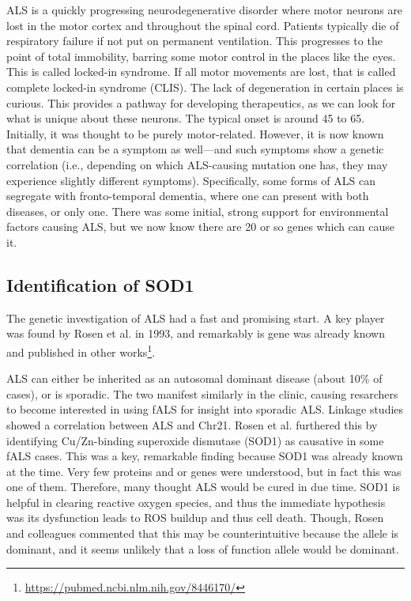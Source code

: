 ALS is a quickly progressing neurodegenerative disorder where motor neurons are lost in the motor cortex and throughout the spinal cord. Patients typically die of respiratory failure if not put on permanent ventilation. This progresses to the point of total immobility, barring some motor control in the places like the eyes. This is called locked-in syndrome. If all motor movements are lost, that is called complete locked-in syndrome (CLIS). The lack of degeneration in certain places is curious. This provides a pathway for developing therapeutics, as we can look for what is unique about these neurons. The typical onset is around 45 to 65. Initially, it was thought to be purely motor-related. However, it is now known that dementia can be a symptom as well---and such symptoms show a genetic correlation (i.e., depending on which ALS-causing mutation one has, they may experience slightly different symptoms). Specifically, some forms of ALS can segregate with fronto-temporal dementia, where one can present with both diseases, or only one. There was some initial, strong support for environmental factors causing ALS, but we now know there are 20 or so genes which can cause it. 

\subsection*{Identification of SOD1}

The genetic investigation of ALS had a fast and promising start. A key player was found by Rosen et al. in 1993, and remarkably is gene was already known and published in other works\footnote{\url{https://pubmed.ncbi.nlm.nih.gov/8446170/}}.\newline

ALS can either be inherited as an autosomal dominant disease (about 10\% of cases), or is sporadic. The two manifest similarly in the clinic, causing resarchers to become interested in using fALS for insight into sporadic ALS. Linkage studies showed a correlation between ALS and Chr21. Rosen et al. furthered this by identifying Cu/Zn-binding superoxide dismutase (SOD1) as causative in some fALS cases. This was a key, remarkable finding because SOD1 was already known at the time. Very few proteins and or genes were understood, but in fact this was one of them. Therefore, many thought ALS would be cured in due time. SOD1 is helpful in clearing reactive oxygen species, and thus the immediate hypothesis was its dysfunction leads to ROS buildup and thus cell death. Though, Rosen and colleagues commented that this may be counterintuitive because the allele is dominant, and it seems unlikely that a loss of function allele would be dominant. \newline

